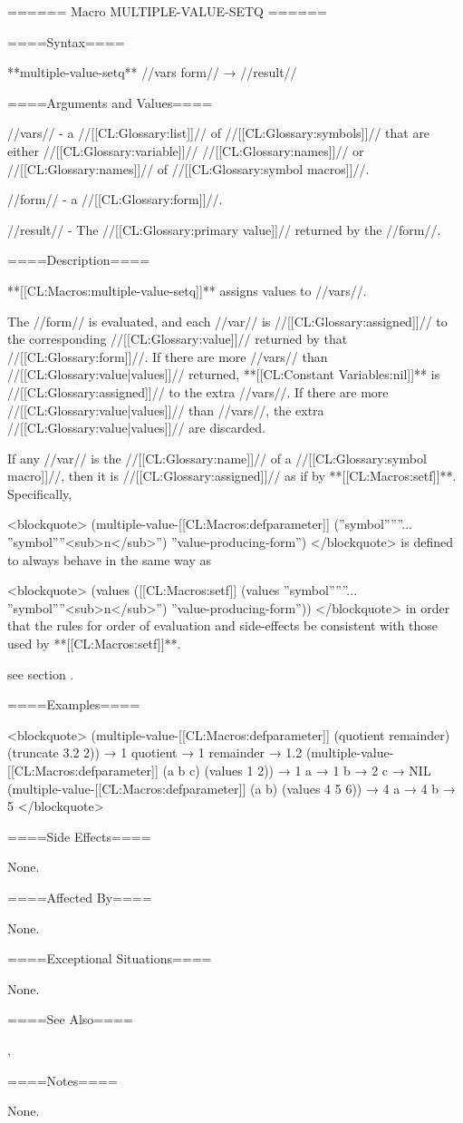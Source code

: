 ====== Macro MULTIPLE-VALUE-SETQ ======

====Syntax====

**multiple-value-setq** //vars form// → //result//

====Arguments and Values====

//vars// - a //[[CL:Glossary:list]]// of //[[CL:Glossary:symbols]]// that are either //[[CL:Glossary:variable]]// //[[CL:Glossary:names]]// or //[[CL:Glossary:names]]// of //[[CL:Glossary:symbol macros]]//.

//form// - a //[[CL:Glossary:form]]//.

//result// - The //[[CL:Glossary:primary value]]// returned by the //form//.

====Description====

**[[CL:Macros:multiple-value-setq]]** assigns values to //vars//.

The //form// is evaluated, and each //var// is //[[CL:Glossary:assigned]]// to the corresponding //[[CL:Glossary:value]]// returned by that //[[CL:Glossary:form]]//. If there are more //vars// than //[[CL:Glossary:value|values]]// returned, **[[CL:Constant Variables:nil]]** is //[[CL:Glossary:assigned]]// to the extra //vars//. If there are more //[[CL:Glossary:value|values]]// than //vars//, the extra //[[CL:Glossary:value|values]]// are discarded.

If any //var// is the //[[CL:Glossary:name]]// of a //[[CL:Glossary:symbol macro]]//, then it is //[[CL:Glossary:assigned]]// as if by **[[CL:Macros:setf]]**. Specifically,

\begingroup {} \def\subN{''<sub>n</sub>''} <blockquote> (multiple-value-[[CL:Macros:defparameter]] (''symbol''\subOne ... ''symbol''\subN) ''value-producing-form'') </blockquote> is defined to always behave in the same way as

<blockquote> (values ([[CL:Macros:setf]] (values ''symbol''\subOne ... ''symbol''\subN) ''value-producing-form'')) </blockquote> \endgroup in order that the rules for order of evaluation and side-effects be consistent with those used by **[[CL:Macros:setf]]**.

see section {\secref\SETFofVALUES}.

====Examples====

<blockquote> (multiple-value-[[CL:Macros:defparameter]] (quotient remainder) (truncate 3.2 2)) → 1 quotient → 1 remainder → 1.2 (multiple-value-[[CL:Macros:defparameter]] (a b c) (values 1 2)) → 1 a → 1 b → 2 c → NIL (multiple-value-[[CL:Macros:defparameter]] (a b) (values 4 5 6)) → 4 a → 4 b → 5 </blockquote>

====Side Effects====

None.

====Affected By====

None.

====Exceptional Situations====

None.

====See Also====

, 

====Notes====

None.

 
